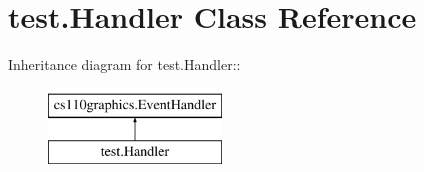\hypertarget{classtest_1_1Handler}{
\section{test.Handler Class Reference}
\label{classtest_1_1Handler}
}
Inheritance diagram for test.Handler::\begin{figure}[H]
\begin{center}
\leavevmode
\includegraphics[height=2cm]{classtest_1_1Handler}
\end{center}
\end{figure}
